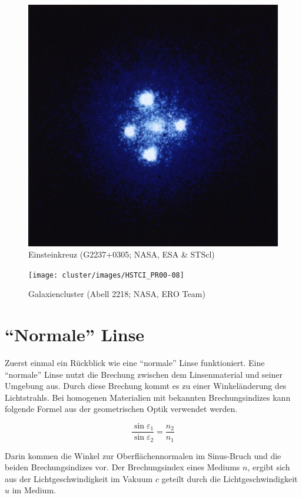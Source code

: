 \begin{refsection}
\begin{figure}
  \centering
  \includegraphics[width=.7\textwidth]{cluster/images/Einstein_cross}
  \caption{Einsteinkreuz (G2237+0305; NASA, ESA \& STScl)
    \cite{wiki:einsteinkreuz}}
  \label{fig:einsteinkreuz}
\end{figure}

\begin{figure}
  \centering
  \texttt{[image: cluster/images/HSTCI\_PR00-08]}
  \caption{Galaxiencluster (Abell 2218; NASA, ERO Team)
    \cite{wiki:abell}}
  \label{fig:abell}
\end{figure}

\section{``Normale'' Linse}
Zuerst einmal ein Rückblick wie eine ``normale'' Linse funktioniert.
Eine ``normale'' Linse nutzt die Brechung zwischen dem Linsenmaterial
und seiner Umgebung aus.  Durch diese Brechung kommt es zu einer
Winkeländerung des Lichtstrahls.  Bei homogenen Materialien mit
bekannten Brechungsindizes kann folgende Formel aus der geometrischen
Optik verwendet werden.

\begin{equation}
  \frac{\sin \varepsilon_1}{\sin \varepsilon_2} = \frac{n_2}{n_1}
\end{equation}

Darin kommen die Winkel zur Oberflächennormalen im Sinus-Bruch
und die beiden Brechungsindizes vor.  Der
Brechungsindex eines Mediums \(n\), ergibt sich aus der
Lichtgeschwindigkeit im Vakuum \(c\) geteilt durch die
Lichtgeschwindigkeit \(u\) im Medium.


\end{refsection}
